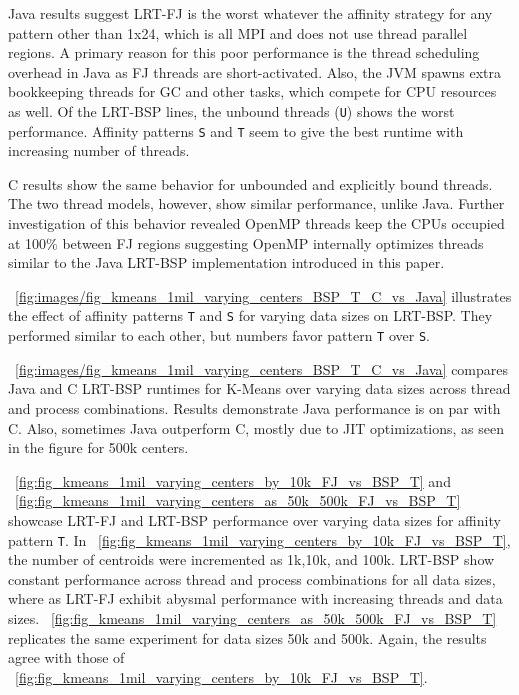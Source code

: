 \documentclass[10pt, conference, compsocconf]{IEEEtran}
\begin{document}
Java results suggest \ac{LRT-FJ} is the worst whatever the affinity strategy for any pattern other than 1x24, which is all \ac{MPI} and does not use thread parallel regions. A primary reason for this poor performance is the thread scheduling overhead in Java as \ac{FJ} threads are short-activated. Also, the \ac{JVM} spawns extra bookkeeping threads for \ac{GC} and other tasks, which compete for \acs{CPU} resources as well. Of the \ac{LRT-BSP} lines, the unbound threads (\texttt{U}) shows the worst performance. Affinity patterns \texttt{S} and \texttt{T} seem to give the best runtime with increasing number of threads. 

C results show the same behavior for unbounded and explicitly bound threads. The two thread models, however, show similar performance, unlike Java. Further investigation of this behavior revealed OpenMP threads keep the \acsp{CPU} occupied at 100\% between \ac{FJ} regions suggesting OpenMP internally optimizes threads similar to the Java \ac{LRT-BSP} implementation introduced in this paper.

\figurename~\ref{fig:images/fig_kmeans_1mil_varying_centers_BSP_T_C_vs_Java} illustrates the effect of affinity patterns \texttt{T} and \texttt{S} for varying data sizes on \ac{LRT-BSP}. They performed similar to each other, but numbers favor pattern \texttt{T} over \texttt{S}.

\figurename~\ref{fig:images/fig_kmeans_1mil_varying_centers_BSP_T_C_vs_Java} compares Java and C \ac{LRT-BSP} runtimes for K-Means over varying data sizes across thread and process combinations. Results demonstrate Java performance is on par with C. Also, sometimes Java outperform C, mostly due to \ac{JIT} optimizations, as seen in the figure for 500k centers. 

\figurename~\ref{fig:fig_kmeans_1mil_varying_centers_by_10k_FJ_vs_BSP_T} and \figurename~\ref{fig:fig_kmeans_1mil_varying_centers_as_50k_500k_FJ_vs_BSP_T} showcase \ac{LRT-FJ} and \ac{LRT-BSP} performance over varying data sizes for affinity pattern \texttt{T}. In \figurename~\ref{fig:fig_kmeans_1mil_varying_centers_by_10k_FJ_vs_BSP_T}, the number of centroids were incremented as 1k,10k, and 100k. \ac{LRT-BSP} show constant performance across thread and process combinations for all data sizes, where as \ac{LRT-FJ} exhibit abysmal performance with increasing threads and data sizes. \figurename~\ref{fig:fig_kmeans_1mil_varying_centers_as_50k_500k_FJ_vs_BSP_T} replicates the same experiment for data sizes 50k and 500k. Again, the results agree with those of \figurename~\ref{fig:fig_kmeans_1mil_varying_centers_by_10k_FJ_vs_BSP_T}.
\end{document}
